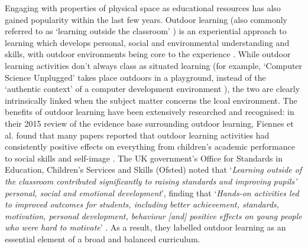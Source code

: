 Engaging with properties of physical space as educational resources has also gained popularity within the last few years. Outdoor learning (also commonly referred to as ‘learning outside the classroom’ \citep{Lotc.org2006}) is an experiential approach to learning which develops personal, social and environmental understanding and skills, with outdoor environments being core to the experience \citep{Harvey2012}. While outdoor learning activities don't always class as situated learning (for example, `Computer Science Unplugged' takes place outdoors in a playground, instead of the `authentic context' of a computer development environment \citep{Bell2009}), the two are clearly intrinsically linked when the subject matter concerns the lcoal environment. The benefits of outdoor learning have been extensively researched and recognised: in their 2015 review of the evidence base surrounding outdoor learning, Fiennes et al. found that many papers reported that outdoor learning activities had consistently positive effects on everything from children's academic performance to social skills and self-image \citep{Fiennes2015}. The UK government's Office for Standards in Education, Children's Services and Skills (Ofsted) noted that `\textit{Learning outside of the classroom contributed significantly to raising standards and improving pupils’ personal, social and emotional development}', finding that `\textit{Hands-on activities led to improved outcomes for students, including better achievement, standards, motivation, personal development, behaviour [and] positive effects on young people who were hard to motivate}' \citep{Ofsted2008}. As a result, they labelled outdoor learning as an essential element of a broad and balanced curriculum.

